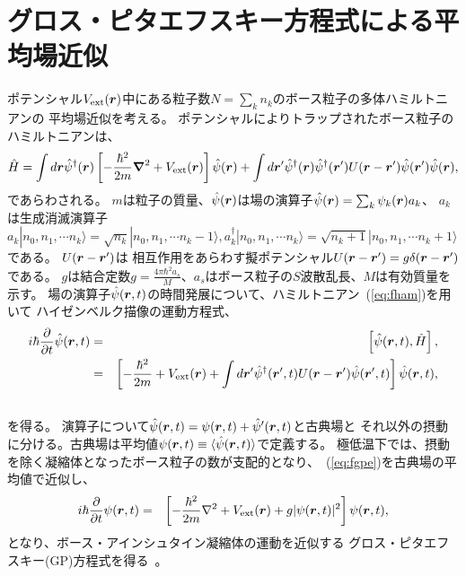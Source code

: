\documentclass[12pt,a4paper]{jbook}
\def\Vec#1{\mbox{\boldmath $#1$}}			%
\begin{document}
		\section{グロス・ピタエフスキー方程式による平均場近似}
        ポテンシャル$V_{\rm ext}(\Vec{r})$中にある粒子数$N=\sum_k n_k$のボース粒子の多体ハミルトニアンの
        平均場近似を考える。
        ポテンシャルによりトラップされたボース粒子のハミルトニアンは、
        \begin{eqnarray}
            \label{eq:fham}
            \hat{H} = \int d \Vec{r} \hat{\psi}^\dagger (\Vec{r}) \left[
                -\frac{\hbar^2}{2m} \Vec{\nabla}^2
                +V_{\rm ext}(\Vec{r})
            \right]
            \hat{\psi}(\Vec{r})
            + \int d \Vec{r}^\prime \hat{\psi}^\dagger(\Vec{r}) \hat{\psi}^\dagger(\Vec{r}^\prime)
            U(\Vec{r}-\Vec{r}^\prime)
            \hat{\psi}(\Vec{r}^\prime) \hat{\psi}(\Vec{r}),
        \end{eqnarray}
        であらわされる。
        $m$は粒子の質量、$\hat{\psi}(\Vec{r})$は場の演算子$\hat{\psi}(\Vec{r})=\sum_k \psi_k(\Vec{r})a_k$、
        $a_k$は生成消滅演算子$a_k|n_0, n_1, \cdots n_k \rangle=\sqrt{n_k}|n_0, n_1, \cdots n_k-1 \rangle,
        a^\dagger_k|n_0, n_1, \cdots n_k \rangle=\sqrt{n_k+1}|n_0, n_1, \cdots n_k+1 \rangle$である。
        $U(\Vec{r} - \Vec{r}^\prime)$は
        相互作用をあらわす擬ポテンシャル$U(\Vec{r} - \Vec{r}^\prime) = g \delta(\Vec{r} - \Vec{r}^\prime)$である。
        $g$は結合定数$g = \frac{4 \pi \hbar^2 a_s}{M}$、$a_s$はボース粒子の$S$波散乱長、$M$は有効質量を示す。
        場の演算子$\hat{\psi}(\Vec{r},t)$の時間発展について、ハミルトニアン~(\ref{eq:fham})を用いて
        ハイゼンベルク描像の運動方程式、
        \begin{eqnarray}
            \label{eq:fgpe}
            i \hbar \frac{\partial}{\partial t} \hat{\psi}(\Vec{r},t) 
            & = & \left[ \hat{\psi}(\Vec{r},t), \hat{H} \right], \nonumber
            \\
            & = & \left[
                - \frac{\hbar^2}{2m} + V_{\rm ext} (\Vec{r})
                + \int d \Vec{r}^\prime \hat{\psi}^\dagger (\Vec{r}^\prime,t)
                U(\Vec{r} - \Vec{r}^\prime) \hat{\psi}(\Vec{r}^\prime,t)
            \right] \hat{\psi}(\Vec{r},t), \nonumber
            \\
            & & 
        \end{eqnarray}
        を得る。
        演算子について$\hat{\psi}(\Vec{r},t)=\psi(\Vec{r},t)+\hat{\psi}^\prime (\Vec{r},t)$と古典場と
        それ以外の摂動に分ける。古典場は平均値$\psi(\Vec{r},t) \equiv \langle \hat{\psi}(\Vec{r},t) \rangle$で定義する。
        極低温下では、摂動を除く凝縮体となったボース粒子の数が支配的となり、~(\ref{eq:fgpe})を古典場の平均値で近似し、
		\begin{eqnarray}
            \label{eq:gpe}
			i \hbar \frac{\partial}{\partial t} \psi ( \Vec{r}, t ) & = &
            \left[
			-\frac{\hbar^2}{2m} \nabla^2
            + V_{\rm ext}(\Vec{r})
			+ g | \psi(\Vec{r}, t) |^2
            \right]\psi(\Vec{r},t),
		\end{eqnarray}
        となり、ボース・アインシュタイン凝縮体の運動を近似する
        グロス・ピタエフスキー(GP)方程式を得る~\cite{Pitaevskii2}。
\end{document}
